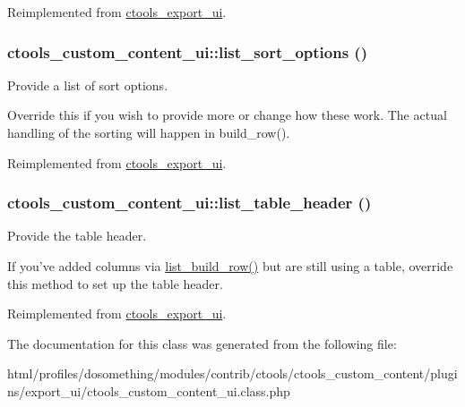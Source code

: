 Reimplemented from \hyperlink{classctools__export__ui_a238e12ec5bfd7325bebad4f6261b6fa5}{ctools\_\-export\_\-ui}.\hypertarget{classctools__custom__content__ui_acc4d7c6bc7a3f3f744882157ca6512c4}{
\subsubsection[{list\_\-sort\_\-options}]{\setlength{\rightskip}{0pt plus 5cm}ctools\_\-custom\_\-content\_\-ui::list\_\-sort\_\-options ()}}
\label{classctools__custom__content__ui_acc4d7c6bc7a3f3f744882157ca6512c4}
Provide a list of sort options.

Override this if you wish to provide more or change how these work. The actual handling of the sorting will happen in build\_\-row(). 

Reimplemented from \hyperlink{classctools__export__ui_ad9839b337e16e3c782eab7967550d3a1}{ctools\_\-export\_\-ui}.\hypertarget{classctools__custom__content__ui_a26ea6386756947b59995763ff673e1aa}{
\subsubsection[{list\_\-table\_\-header}]{\setlength{\rightskip}{0pt plus 5cm}ctools\_\-custom\_\-content\_\-ui::list\_\-table\_\-header ()}}
\label{classctools__custom__content__ui_a26ea6386756947b59995763ff673e1aa}
Provide the table header.

If you've added columns via \hyperlink{classctools__custom__content__ui_a56ee3ac6704a7d3736da6d9cc6b229d4}{list\_\-build\_\-row()} but are still using a table, override this method to set up the table header. 

Reimplemented from \hyperlink{classctools__export__ui_a01b1219535377db871132934f806b8a0}{ctools\_\-export\_\-ui}.

The documentation for this class was generated from the following file:\begin{DoxyCompactItemize}
\item 
html/profiles/dosomething/modules/contrib/ctools/ctools\_\-custom\_\-content/plugins/export\_\-ui/ctools\_\-custom\_\-content\_\-ui.class.php\end{DoxyCompactItemize}
